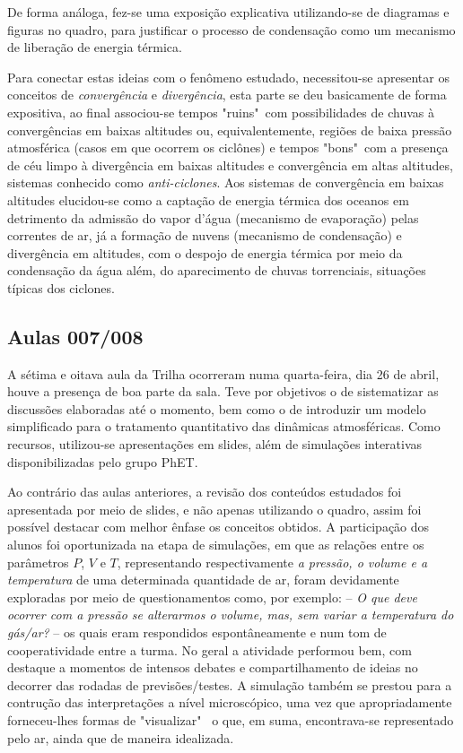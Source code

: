 De forma análoga, fez-se uma exposição explicativa utilizando-se de diagramas e figuras no quadro, para justificar o processo de condensação como um mecanismo de liberação de energia térmica. 

Para conectar estas ideias com o fenômeno estudado, necessitou-se apresentar os conceitos de \textit{convergência} e \textit{divergência}, esta parte se deu basicamente de forma expositiva, ao final associou-se tempos "ruins"~com possibilidades de chuvas à convergências em baixas altitudes ou, equivalentemente, regiões de baixa pressão atmosférica (casos em que ocorrem os ciclônes) e tempos "bons"~com a presença de céu limpo à divergência em baixas altitudes e convergência em altas altitudes, sistemas conhecido como \textit{anti-ciclones}. Aos sistemas de convergência em baixas altitudes elucidou-se como a captação de energia térmica dos oceanos em detrimento da admissão do vapor d'água (mecanismo de evaporação) pelas correntes de ar, já a formação de nuvens (mecanismo de condensação) e divergência em altitudes, com o despojo de energia térmica por meio da condensação da água além, do aparecimento de chuvas torrenciais, situações típicas dos ciclones.

\subsection{Aulas 007/008} %
\label{sub:Aulas 007/008}
A sétima e oitava aula da Trilha ocorreram numa quarta-feira, dia 26 de abril, houve a presença de boa parte da sala. Teve por objetivos o de sistematizar as discussões elaboradas até o momento, bem como o de introduzir um modelo simplificado para o tratamento quantitativo das dinâmicas atmosféricas. Como recursos, utilizou-se apresentações em slides, além de simulações interativas disponibilizadas pelo grupo \ac{PhET}.

Ao contrário das aulas anteriores, a revisão dos conteúdos estudados foi apresentada por meio de slides, e não apenas utilizando o quadro, assim foi possível destacar com melhor ênfase os conceitos obtidos. A participação dos alunos foi oportunizada na etapa de simulações, em que as relações entre os parâmetros $P$, $V$ e $T$, representando respectivamente \textit{a pressão, o volume e a temperatura} de uma determinada quantidade de ar, foram devidamente exploradas por meio de questionamentos como, por exemplo: -- \textit{O que deve ocorrer com a pressão se alterarmos o volume, mas, sem variar a temperatura do gás/ar?} -- os quais eram respondidos espontâneamente e num tom de cooperatividade entre a turma. No geral a atividade performou bem, com destaque a momentos de intensos debates e compartilhamento de ideias no decorrer das rodadas de previsões/testes. A simulação também se prestou para a contrução das interpretações a nível microscópico, uma vez que apropriadamente forneceu-lhes formas de "visualizar"~ o que, em suma, encontrava-se representado pelo ar, ainda que de maneira idealizada.

